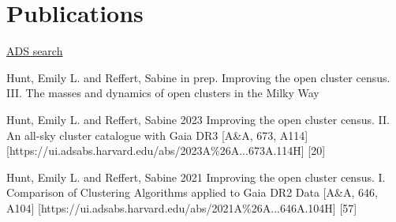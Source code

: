 \section*{Publications}

\href{\cvADSLink}{ADS search \faLink}%


\begin{etaremune}
    \item \publication
        {Hunt, Emily L. and Reffert, Sabine}
        {in prep.}
        {Improving the open cluster census. III. The masses and dynamics of open clusters in the Milky Way}
    \item \publication
        {Hunt, Emily L. and Reffert, Sabine}
        {2023}
        {Improving the open cluster census. II. An all-sky cluster catalogue with Gaia DR3}
        [A\&A, 673, A114]
        [https://ui.adsabs.harvard.edu/abs/2023A\%26A...673A.114H]
        [20]
    \item \publication
        {Hunt, Emily L. and Reffert, Sabine}
        {2021}
        {Improving the open cluster census. I. Comparison of Clustering Algorithms applied to Gaia DR2 Data}
        [A\&A, 646, A104]
        [https://ui.adsabs.harvard.edu/abs/2021A\%26A...646A.104H]
        [57]
\end{etaremune}